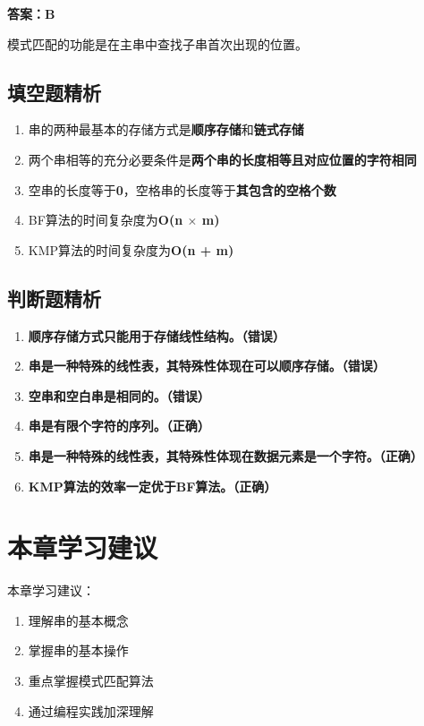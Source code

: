 \documentclass[12pt, a4paper]{article}
\begin{document}
\begin{framed}
	\textbf{答案：B}

	模式匹配的功能是在主串中查找子串首次出现的位置。
\end{framed}

\subsection{填空题精析}

\begin{enumerate}
	\item 串的两种最基本的存储方式是\textbf{顺序存储}和\textbf{链式存储}
	\item 两个串相等的充分必要条件是\textbf{两个串的长度相等且对应位置的字符相同}
	\item 空串的长度等于\textbf{0}，空格串的长度等于\textbf{其包含的空格个数}
	\item BF算法的时间复杂度为\textbf{O(n $\times$ m)}
	\item KMP算法的时间复杂度为\textbf{O(n + m)}
\end{enumerate}

\subsection{判断题精析}

\begin{enumerate}
	\item \textbf{顺序存储方式只能用于存储线性结构。（错误）}
	\item \textbf{串是一种特殊的线性表，其特殊性体现在可以顺序存储。（错误）}
	\item \textbf{空串和空白串是相同的。（错误）}
	\item \textbf{串是有限个字符的序列。（正确）}
	\item \textbf{串是一种特殊的线性表，其特殊性体现在数据元素是一个字符。（正确）}
	\item \textbf{KMP算法的效率一定优于BF算法。（正确）}
\end{enumerate}

\section{本章学习建议}

本章学习建议：

\begin{enumerate}
	\item 理解串的基本概念
	\item 掌握串的基本操作
	\item 重点掌握模式匹配算法
	\item 通过编程实践加深理解
\end{enumerate}
\end{document}
